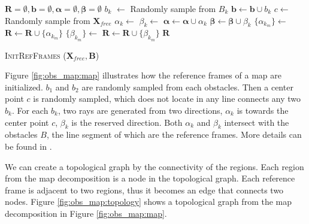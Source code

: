 \documentclass[letterpaper, 10 pt, conference]{ieeeconf}
\begin{document}
\begin{algorithm}[hbtp]
	\begin{algorithmic}[1]
		\State $ \bm{R} = \emptyset, \bm{b} = \emptyset, \bm{\alpha} = \emptyset, \bm{\beta} = \emptyset $
		\State $ b_{k} $ $ \leftarrow $ Randomly sample from $ B_{k} $
		\State $ \bm{b} \leftarrow \bm{b} \cup b_{k} $
		\EndFor
		\State $ c \leftarrow  $ Randomly sample from $ \bm{X}_{free} $
		\EndWhile
		\State $ \alpha_{k} \leftarrow $ 
		\State $ \beta_{k} \leftarrow $ 
		\State $ \bm{\alpha} \leftarrow \bm{\alpha} \cup \alpha_{k} $
		\State $ \bm{\beta} \leftarrow \bm{\beta} \cup \beta_{k} $			
		\EndFor
		\State $ \{ \alpha_{k_{m}} \} \leftarrow $ 
		\State $ \bm{R} \leftarrow \bm{R} \cup \{ \alpha_{k_{m}} \} $
		\EndFor
		\State $ \{ \beta_{k_{m}} \} \leftarrow $ 
		\State $ \bm{R} \leftarrow \bm{R} \cup \{ \beta_{k_{m}} \} $
		\EndFor
		\Return $ \bm{R} $
	\end{algorithmic}
	\caption{ \textsc{InitRefFrames} ($ \bm{X}_{free} , \bm{B} $) }
	\label{alg:harrt:init_ref_frames}
\end{algorithm} 

Figure \ref{fig:obs_map:map} illustrates how the reference frames of a map are initialized.
$ b_{1} $ and $ b_{2} $ are randomly sampled from each obstacles.
Then a center point $ c $ is randomly sampled, which does not locate in any line connects any two $ b_{k} $.
For each $ b_{k} $, two rays are generated from two directions, $ \alpha_{k} $ is towards the center point $ c $, $ \beta_{k} $ is the reserved direction.
Both $ \alpha_{k} $ and $ \beta_{k} $ intersect with the obstacles $ B $, the line segment of which are the reference frames.
More details can be found in \cite{Hernandez201544}.

We can create a topological graph by the connectivity of the regions.
Each region from the map decomposition is a node in the topological graph.
Each reference frame is adjacent to two regions, thus it becomes an edge that connects two nodes.
Figure \ref{fig:obs_map:topology} shows a topological graph from the map decomposition in Figure \ref{fig:obs_map:map}.
\end{document}
